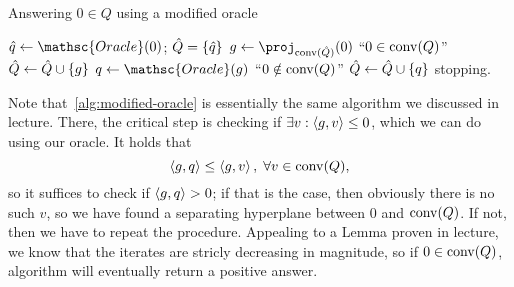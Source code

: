 \documentclass[10pt]{article}
\begin{document}
\begin{Answer}
	\begin{algorithm}
		\caption{Answering $0 \in Q$ using a modified oracle}
		\begin{algorithmic}
			\State $\hat{q} \gets \mathsc{Oracle}(0)$; $\hat{Q} =
			\left\{ \hat{q} \right\}$ 
			\Repeat
				$g \gets \proj_{\convhull(\hat{Q})}(0)$
					\State \Return ``$0 \in \mathrm{conv}(Q)$''
				\Else
					\State $\hat{Q} \gets \hat{Q} \cup \left\{ g \right\}$
				\EndIf
				\State $q \gets \mathsc{Oracle}(g)$
					\State \Return ``$0 \notin \mathrm{conv}(Q)$''
				\EndIf
				\State $\hat{Q} \gets \hat{Q} \cup \left\{ q \right\}$
			\Until stopping.
		\end{algorithmic}
		\label{alg:modified-oracle}
	\end{algorithm}
	Note that~\cref{alg:modified-oracle} is essentially the same algorithm we
	discussed in lecture. There, the critical step is checking if $\exists v:
	\left\langle g, v \right\rangle \leq 0$, which we can do using our oracle. It holds that
	\[
		\left\langle g, q \right\rangle \leq \left\langle g, v \right\rangle, \; \forall v \in \mathrm{conv}(Q),
	\]
	so it suffices to check if $\left\langle g, q \right\rangle > 0$; if that is the case, then
	obviously there is no such $v$, so we have found a separating hyperplane
	between $0$ and $\mathrm{conv}(Q)$. If not, then we have to repeat the
	procedure. Appealing to a Lemma proven in lecture, we know that the
	iterates are stricly decreasing in magnitude, so if $0 \in \mathrm{conv}(Q)$,
	algorithm will eventually return a positive answer.
\end{Answer}




\end{document}
